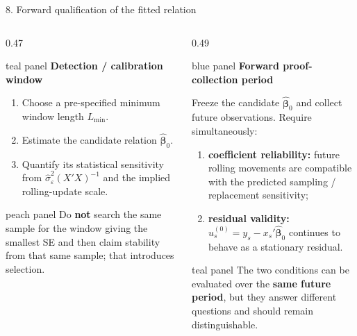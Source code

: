 \documentclass[aspectratio=169,10pt]{beamer}
\newenvironment{tealpanel}{\begin{beamercolorbox}[wd=\linewidth,sep=0.16cm,rounded=true]{teal panel}}{\end{beamercolorbox}}
\newenvironment{peachpanel}{\begin{beamercolorbox}[wd=\linewidth,sep=0.16cm,rounded=true]{peach panel}}{\end{beamercolorbox}}
\newenvironment{bluepanel}{\begin{beamercolorbox}[wd=\linewidth,sep=0.16cm,rounded=true]{blue panel}}{\end{beamercolorbox}}
\begin{document}
\begin{frame}{8. Forward qualification of the fitted relation}
\scriptsize
\begin{columns}[T,onlytextwidth]
\begin{column}{0.47\textwidth}
\begin{tealpanel}
\textbf{Detection / calibration window}
\begin{enumerate}\setlength\itemsep{0.05cm}
\item Choose a pre-specified minimum window length $L_{\min}$.
\item Estimate the candidate relation $\hat{\bm\beta}_0$.
\item Quantify its statistical sensitivity from $\hat\sigma_\varepsilon^2(X'X)^{-1}$ and the implied rolling-update scale.
\end{enumerate}
\end{tealpanel}

\vspace{0.10cm}
\begin{peachpanel}
Do \textbf{not} search the same sample for the window giving the smallest SE and then claim stability from that same sample; that introduces selection.
\end{peachpanel}
\end{column}

\begin{column}{0.49\textwidth}
\begin{bluepanel}
\textbf{Forward proof-collection period}

Freeze the candidate $\hat{\bm\beta}_0$ and collect future observations. Require simultaneously:
\begin{enumerate}\setlength\itemsep{0.06cm}
\item \textbf{coefficient reliability:} future rolling movements are compatible with the predicted sampling / replacement sensitivity;
\item \textbf{residual validity:} $u_s^{(0)}=y_s-x_s'\hat{\bm\beta}_0$ continues to behave as a stationary residual.
\end{enumerate}
\end{bluepanel}

\vspace{0.10cm}
\begin{tealpanel}
\centering
The two conditions can be evaluated over the \textbf{same future period}, but they answer different questions and should remain distinguishable.
\end{tealpanel}
\end{column}
\end{columns}
\end{frame}
\end{document}

